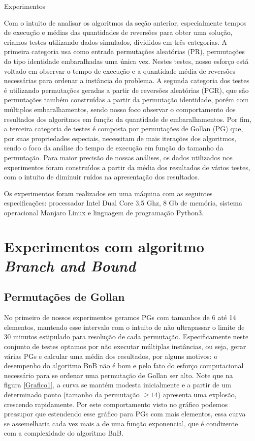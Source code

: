 \begin{chapter}{Experimentos} \label{cap:experimentos}

Com o intuito de analisar os algoritmos da seção anterior, especialmente tempos de execução e médias das quantidades de reversões para obter uma solução, criamos testes utilizando dados simulados, divididos em três categorias. A primeira categoria usa como entrada permutações aleatórias (PR), permutações do tipo identidade embaralhadas uma única vez. Nestes testes, nosso esforço está voltado em observar o tempo de execução e a quantidade média de reversões necessárias para ordenar a instância do problema. A segunda categoria dos testes é utilizando permutações geradas a partir de reversões aleatórias (PGR), que são permutações também construídas a partir da permutação identidade, porém com múltiplos embaralhamentos, sendo nosso foco observar o comportamento dos resultados dos algoritmos em função da quantidade de embaralhamentos. Por fim, a terceira categoria de testes é composta por permutações de Gollan (PG) que, por suas propriedades especiais, necessitam de mais iterações dos algoritmos, sendo o foco da análise do tempo de execução em função do tamanho da permutação. Para maior precisão de nossas análises, os dados utilizados nos experimentos foram construídos a partir da média dos resultados de vários testes, com o intuito de diminuir ruídos na apresentação dos resultados. 
    
Os experimentos foram realizados em uma máquina com as seguintes especificações: processador Intel Dual Core 3,5 Ghz, 8 Gb de memória, sistema operacional Manjaro Linux e linguagem de programação Python3. 

\section{Experimentos com algoritmo \textit{Branch and Bound}}

\subsection{Permutações de Gollan}

No primeiro de nossos experimentos geramos PGs com tamanhos de 6 até 14 elementos, mantendo esse intervalo com o intuito de não ultrapassar o limite de 30 minutos estipulado para resolução de cada permutação. Especificamente neste conjunto de testes optamos por não executar múltiplas instâncias, ou seja, gerar várias PGs e calcular uma média dos resultados, por alguns motivos: o desempenho do algoritmo BnB não é bom e pelo fato do esforço computacional necessário para se ordenar uma permutação de Gollan ser alto. Note que na figura \ref{Grafico1}, a curva se mantém modesta inicialmente e a partir de um determinado ponto (tamanho da permutação $\ge 14$) apresenta uma explosão, crescendo rapidamente. Por este comportamento visto no gráfico podemos pressupor que estendendo esse gráfico para PGs com mais elementos, essa curva se assemelharia cada vez mais a de uma função exponencial, que é condizente com a complexidade do algoritmo BnB.


\end{chapter}

